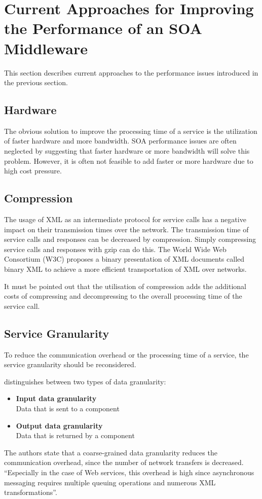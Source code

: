 \section{Current Approaches for Improving the Performance of an SOA Middleware}
This section describes current approaches to the performance issues introduced in the previous section.
\subsection{Hardware}
The obvious solution to improve the processing time of a service is the utilization of faster hardware and more bandwidth. SOA performance issues are often neglected by suggesting that faster hardware or more bandwidth will solve this problem. However, it is often not feasible to add faster or more hardware due to high cost pressure.
\subsection{Compression}
The usage of XML as an intermediate protocol for service calls has a negative impact on their transmission times over the network. The transmission time of service calls and responses can be decreased by compression. Simply compressing service calls and responses with gzip can do this. The World Wide Web Consortium (W3C) proposes a binary presentation of XML documents called binary XML \citep{EXI:2007} to achieve a more efficient transportation of XML over networks.

It must be pointed out that the utilisation of compression adds the additional costs of compressing and decompressing to the overall processing time of the service call.
\subsection{Service Granularity}
To reduce the communication overhead or the processing time of a service, the service granularity should be reconsidered.

\cite{Haesen:2008ve} distinguishes between two types of data granularity:
\begin{itemize}
	\item \textbf{Input data granularity}\\
	Data that is sent to a component
	\item \textbf{Output data granularity}\\
	Data that is returned by a component
\end{itemize}
The authors state that a coarse-grained data granularity reduces the communication overhead, since the number of network transfers is decreased.
``Especially in the case of Web services, this overhead is high since asynchronous messaging requires multiple queuing operations and numerous XML transformations''.

